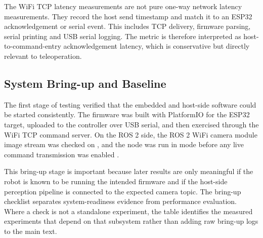 \documentclass[12pt, a4paper]{article}
\begin{document}
The WiFi TCP latency measurements are not pure one-way network latency measurements. They record the host send timestamp and match it to an ESP32 acknowledgement or serial event. This includes TCP delivery, firmware parsing, serial printing and USB serial logging. The metric is therefore interpreted as host-to-command-entry acknowledgement latency, which is conservative but directly relevant to teleoperation.

\subsection{System Bring-up and Baseline}

The first stage of testing verified that the embedded and host-side software could be started consistently. The firmware was built with PlatformIO for the ESP32 target, uploaded to the controller over USB serial, and then exercised through the WiFi TCP command server. On the ROS 2 side, the ROS 2 WiFi camera module image stream was checked on \texttt{}, and the \texttt{} node was run in \texttt{} mode before any live command transmission was enabled \cite{platformio_core_docs,lugaresi2019mediapipe}.

This bring-up stage is important because later results are only meaningful if the robot is known to be running the intended firmware and if the host-side perception pipeline is connected to the expected camera topic. The bring-up checklist separates system-readiness evidence from performance evaluation. Where a check is not a standalone experiment, the table identifies the measured experiments that depend on that subsystem rather than adding raw bring-up logs to the main text.
\end{document}
